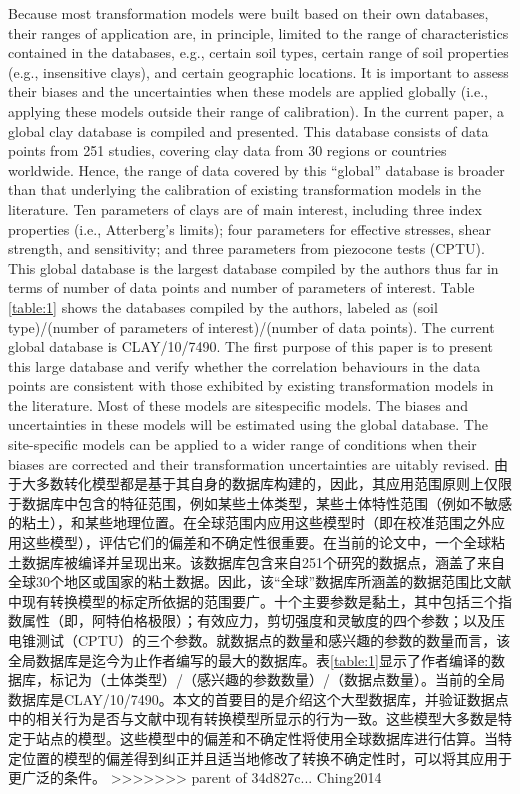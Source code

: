 \begin{paracol}{2}
\begin{Parallel}{0.60\textwidth}{}
{    }
    \ParallelPar
    \ParallelLText
    {
        Because most transformation models were built based on their own databases, their ranges of application are, in principle, limited to the range of characteristics contained in the databases, e.g., certain soil types, certain range of soil properties (e.g., insensitive clays), and certain geographic locations. It is important to assess their biases and the uncertainties when these models are applied globally (i.e., applying these models outside their range of calibration). In the current paper, a global clay database is compiled and presented. This database consists of data points from 251 studies, covering clay data from 30 regions or countries worldwide. Hence, the range of data covered by this “global” database is broader than that underlying the calibration of existing transformation models in the literature. Ten parameters of clays are of main interest, including three index properties (i.e., Atterberg’s limits); four parameters for effective stresses, shear strength, and sensitivity; and three parameters from piezocone tests (CPTU). This global database is the largest database compiled by the authors thus far in terms of number of data points and number of parameters of interest. Table \ref{table:1} shows the databases compiled by the authors, labeled as (soil type)/(number of parameters of interest)/(number of data points). The current global database is CLAY/10/7490. The first purpose of this paper is to present this large database and verify whether the correlation behaviours in the data points are consistent with those exhibited by existing transformation models in the literature. Most of these models are sitespecific models. The biases and uncertainties in these models will be estimated using the global database. The site-specific models can be applied to a wider range of conditions when their biases are corrected and their transformation uncertainties are  uitably revised.
    }
    \ParallelRText
    {
        由于大多数转化模型都是基于其自身的数据库构建的，因此，其应用范围原则上仅限于数据库中包含的特征范围，例如某些土体类型，某些土体特性范围（例如不敏感的粘土），和某些地理位置。在全球范围内应用这些模型时（即在校准范围之外应用这些模型），评估它们的偏差和不确定性很重要。在当前的论文中，一个全球粘土数据库被编译并呈现出来。该数据库包含来自251个研究的数据点，涵盖了来自全球30个地区或国家的粘土数据。因此，该“全球”数据库所涵盖的数据范围比文献中现有转换模型的标定所依据的范围要广。十个主要参数是黏土，其中包括三个指数属性（即，阿特伯格极限）；有效应力，剪切强度和灵敏度的四个参数；以及压电锥测试（CPTU）的三个参数。就数据点的数量和感兴趣的参数的数量而言，该全局数据库是迄今为止作者编写的最大的数据库。表\ref{table:1}显示了作者编译的数据库，标记为（土体类型）/（感兴趣的参数数量）/（数据点数量）。当前的全局数据库是CLAY/10/7490。本文的首要目的是介绍这个大型数据库，并验证数据点中的相关行为是否与文献中现有转换模型所显示的行为一致。这些模型大多数是特定于站点的模型。这些模型中的偏差和不确定性将使用全球数据库进行估算。当特定位置的模型的偏差得到纠正并且适当地修改了转换不确定性时，可以将其应用于更广泛的条件。
    }
    \ParallelPar
>>>>>>> parent of 34d827c... Ching2014
    
    \switchcolumn*


\end{Parallel}
\end{paracol}
